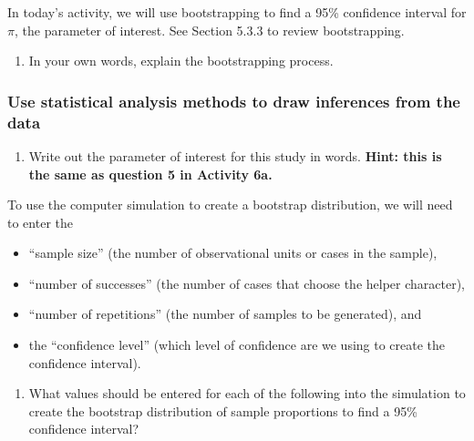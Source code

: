 \documentclass[
]{report}
\providecommand{\tightlist}{%
  \setlength{\itemsep}{0pt}\setlength{\parskip}{0pt}}
\begin{document}
\vspace{0.5in}

In today's activity, we will use bootstrapping to find a 95\% confidence interval for \(\pi\), the parameter of interest. See Section 5.3.3 to review bootstrapping.

\begin{enumerate}
\def\labelenumi{\arabic{enumi}.}
\setcounter{enumi}{2}
\tightlist
\item
  In your own words, explain the bootstrapping process.
  \vspace{0.5in}
\end{enumerate}

\hypertarget{use-statistical-analysis-methods-to-draw-inferences-from-the-data-1}{%
\subsubsection*{Use statistical analysis methods to draw inferences from the data}\label{use-statistical-analysis-methods-to-draw-inferences-from-the-data-1}}

\begin{enumerate}
\def\labelenumi{\arabic{enumi}.}
\setcounter{enumi}{3}
\tightlist
\item
  Write out the parameter of interest for this study in words. \textbf{Hint: this is the same as question 5 in Activity 6a.}
\end{enumerate}

\vspace{0.5in}

To use the computer simulation to create a bootstrap distribution, we will need to enter the

\begin{itemize}
\tightlist
\item
  ``sample size'' (the number of observational units or cases in the sample),
\item
  ``number of successes'' (the number of cases that choose the helper character),
\item
  ``number of repetitions'' (the number of samples to be generated), and
\item
  the ``confidence level'' (which level of confidence are we using to create the confidence interval).
\end{itemize}

\begin{enumerate}
\def\labelenumi{\arabic{enumi}.}
\setcounter{enumi}{4}
\tightlist
\item
  What values should be entered for each of the following into the simulation to create the bootstrap distribution of sample proportions to find a 95\% confidence interval?
  \vspace{1mm}
\end{enumerate}
\end{document}
